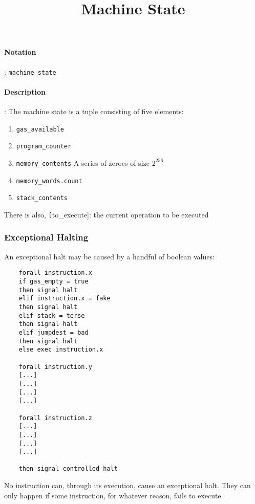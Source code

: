 \documentclass[10pt,a4paper,oneside]{scrartcl}
\author{}
\title{Machine State}
\date{}
\begin{document}
\maketitle
\paragraph{Notation}: \texttt{machine\_state}
\paragraph{Description}: The machine state is a tuple consisting of five elements:

	\begin{enumerate}
		\item \texttt{gas\_available}
		\item \texttt{program\_counter}
		\item \texttt{memory\_contents} A series of zeroes of size $2^{256}$
		\item \texttt{memory\_words.count}
		\item \texttt{stack\_contents}
	\end{enumerate}
	
	There is also, \texttt[to\_execute]: the current operation to be executed

\subsubsection{Exceptional Halting}
An exceptional halt may be caused by a handful of boolean values:

\begin{verbatim}
	forall instruction.x
	if gas_empty = true
	then signal halt
	elif instruction.x = fake
	then signal halt
	elif stack = terse
	then signal halt
	elif jumpdest = bad
	then signal halt
	else exec instruction.x
	
	forall instruction.y 
	[...]
	[...]
	[...]
	[...]

	forall instruction.z 
	[...]
	[...]
	[...]
	[...]

	then signal controlled_halt
\end{verbatim}

No instruction can, through its execution, cause an exceptional halt. They can only happen if some instruction, for whatever reason, fails to execute.
\end{document}
